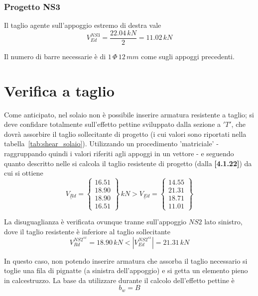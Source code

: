 \subsubsection{Progetto NS3}
Il taglio agente sull'appoggio estremo di destra vale
\[
V_{Ed}^{NS3} = \dfrac{22.04\,kN}{2} = 11.02\,kN
\]

Il numero di barre necessarie è di $1\,\Phi\,12\,mm$ come sugli appoggi precedenti.

\section{Verifica a taglio}\label{sec:shearSolaio}
Come anticipato, nel solaio non è possibile inserire armatura resistente a taglio; si deve confidare totalmente sull'effetto pettine sviluppato dalla sezione a $'T'$, che dovrà assorbire il taglio sollecitante di progetto (i cui valori sono riportati nella tabella~\ref{tab:shear_solaio}). Utilizzando un procedimento 'matriciale' - raggruppando quindi i valori riferiti agli appoggi in un vettore - e seguendo quanto descritto nelle \ntc si calcola il taglio resistente di progetto (dalla \textbf{[4.1.22]}) da cui si ottiene
\[
\underline{V_{Rd}} = 
\begin{Bmatrix}
	16.51\\
	18.90\\
	18.90\\
	16.51
\end{Bmatrix}\,kN > \underline{V_{Ed}} = 
\begin{Bmatrix}
	14.55\\
	21.31\\
	18.71\\
	11.01
\end{Bmatrix}
\]



La disuguaglianza è verificata ovunque tranne sull'appoggio $NS2$ lato sinistro, dove il taglio resistente è inferiore al taglio sollecitante
\[
V_{Rd}^{NS2^{sx}} = 18.90\,kN < \left|V_{Ed}^{NS2^{sx}}\right| = 21.31\,kN
\]

In questo caso, non potendo inserire armatura che assorba il taglio necessario si toglie una fila di pignatte (a sinistra dell'appoggio) e si getta un elemento pieno in calcestruzzo. La base da utilizzare durante il calcolo dell'effetto pettine è 
\[
b_w = B                                                                                                                                                                                                                                                                                                                                                                                                                                                                                                                  \]

